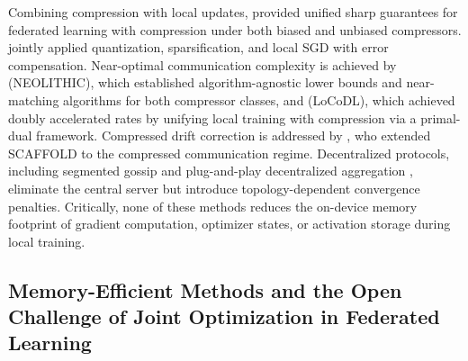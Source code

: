 \documentclass[11pt]{article}
\begin{document}
Combining compression with local updates, \citet{Haddadpour2020FederatedLW} provided unified sharp guarantees for federated learning with compression under both biased and unbiased compressors. \citet{basu2019qsparse} jointly applied quantization, sparsification, and local SGD with error compensation. Near-optimal communication complexity is achieved by \citet{He2023LowerBA} (NEOLITHIC), which established algorithm-agnostic lower bounds and near-matching algorithms for both compressor classes, and \citet{Condat2024LoCoDLCD} (LoCoDL), which achieved doubly accelerated rates by unifying local training with compression via a primal-dual framework. Compressed drift correction is addressed by \citet{Huang2023StochasticCA}, who extended SCAFFOLD to the compressed communication regime. Decentralized protocols, including segmented gossip \citep{hu2019decentralized} and plug-and-play decentralized aggregation \citep{zhou2022defta}, eliminate the central server but introduce topology-dependent convergence penalties. Critically, none of these methods reduces the on-device memory footprint of gradient computation, optimizer states, or activation storage during local training.

\subsection{Memory-Efficient Methods and the Open Challenge of Joint Optimization in Federated Learning}
\end{document}
